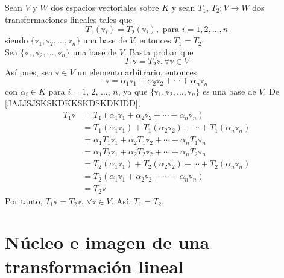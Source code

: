 \begin{theorem}\label{theorem:LAKAAKLKSKSKSSIIS}
    Sean $V$ y $W$ dos espacios vectoriales sobre $K$ y sean $T_1$, $T_2:V \longrightarrow W$ dos transformaciones lineales tales que
    $$T_1(\mathbb{v}_i) = T_2(\mathbb{v}_i), \text{ para } i = 1,  2,  \dots,  n$$
    siendo $\{ \mathbb{v}_1,  \mathbb{v}_2,  \dots,  \mathbb{v}_n \}$ una base de $V$, entonces $T_1 = T_2$. \\
    \demostracion
    Sea $\{ \mathbb{v}_1,  \mathbb{v}_2,  \dots,  \mathbb{v}_n \}$ una base de $V$. Basta probar que
    $$T_1\mathbb{v} = T_2 \mathbb{v}, \forall \mathbb{v} \in V$$
    Así pues, sea $\mathbb{v} \in V$ un elemento arbitrario, entonces
    \begin{equation}
        \mathbb{v} = \alpha_1 \mathbb{v}_1 + \alpha_2 \mathbb{v}_2 + \cdots + \alpha_n \mathbb{v}_n \label{JAJJSJSKSKDKKSKDSKDKIDD}
    \end{equation}
    con $\alpha_i \in K$ para $i = 1$, $2$, $\dots$, $n$, ya que $\{ \mathbb{v}_1,  \mathbb{v}_2,  \dots,  \mathbb{v}_n \}$ es una base de $V$. De \eqref{JAJJSJSKSKDKKSKDSKDKIDD},
    \begin{align*}
        T_1 \mathbb{v} & = T_1(\alpha_1 \mathbb{v}_1 + \alpha_2 \mathbb{v}_2 + \cdots + \alpha_n \mathbb{v}_n) \\
        & = T_1(\alpha_1 \mathbb{v}_1) + T_1(\alpha_2 \mathbb{v}_2) + \cdots + T_1(\alpha_n \mathbb{v}_n) \\
        & = \alpha_1 T_1 \mathbb{v}_1 + \alpha_2 T_1 \mathbb{v}_2 + \cdots + \alpha_n T_1 \mathbb{v}_n \\
        & = \alpha_1 T_2 \mathbb{v}_1 + \alpha_2 T_2 \mathbb{v}_2 + \cdots + \alpha_n T_2 \mathbb{v}_n \\
        & = T_2(\alpha_1 \mathbb{v}_1) + T_2(\alpha_2 \mathbb{v}_2) + \cdots + T_2(\alpha_n \mathbb{v}_n) \\
        & = T_2(\alpha_1 \mathbb{v}_1 + \alpha_2 \mathbb{v}_2 + \cdots + \alpha_n \mathbb{v}_n) \\
        & = T_2 \mathbb{v}
    \end{align*}
    Por tanto, $T_1 \mathbb{v} = T_2 \mathbb{v}$, $\forall \mathbb{v} \in V$. Así, $T_1 = T_2$.
\end{theorem}

\section{Núcleo e imagen de una transformación lineal}

